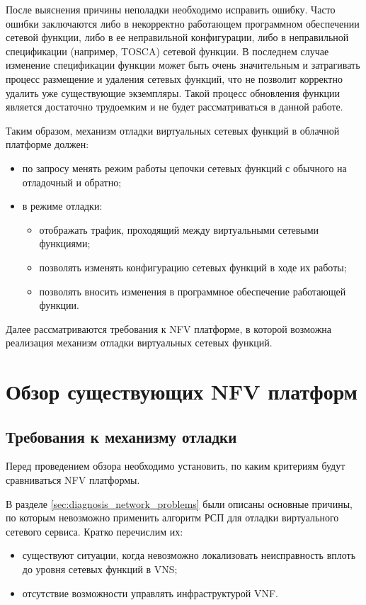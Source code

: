 \documentclass[oneside,final,14pt,a4paper]{extreport}
\begin{document}
После выяснения причины неполадки необходимо исправить ошибку. Часто ошибки заключаются либо в некорректно работающем программном обеспечении сетевой функции, либо в ее неправильной конфигурации, либо в неправильной спецификации (например, TOSCA\cite{bib:tosca}) сетевой функции. В последнем случае изменение спецификации функции может быть очень значительным и затрагивать процесс размещение и удаления сетевых функций, что не позволит корректно удалить уже существующие экземпляры. Такой процесс обновления функции является достаточно трудоемким и не будет рассматриваться в данной работе.

Таким образом, механизм отладки виртуальных сетевых функций в облачной платформе должен:
\begin{itemize}
    \item по запросу менять режим работы цепочки сетевых функций с обычного на отладочный и обратно;
    \item в режиме отладки:
    \begin{itemize}
        \item отображать трафик, проходящий между виртуальными сетевыми функциями;
        \item позволять изменять конфигурацию сетевых функций в ходе их работы;
        \item позволять вносить изменения в программное обеспечение работающей функции.
    \end{itemize}
\end{itemize}

Далее рассматриваются требования к NFV платформе, в которой возможна реализация механизм отладки виртуальных сетевых функций.





\chapter{Обзор существующих NFV платформ}
\label{nfv_platform_overview}


\section{Требования к механизму отладки}
\label{sec:debug_requirements}
Перед проведением обзора необходимо установить, по каким критериям будут сравниваться NFV платформы.

В разделе \ref{sec:diagnosis_network_problems} были описаны основные причины, по которым невозможно применить алгоритм РСП для отладки виртуального сетевого сервиса. Кратко перечислим их:
\begin{itemize}
    \item существуют ситуации, когда невозможно локализовать неисправность вплоть до уровня сетевых функций в VNS;
    \item отсутствие возможности управлять инфраструктурой VNF.
\end{itemize}
\end{document}
